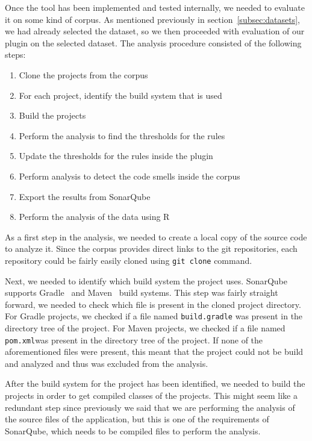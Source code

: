 
Once the tool has been implemented and tested internally, we needed to evaluate it on some kind of corpus.
As mentioned previously in section~\ref{subsec:datasets}, we had already selected the dataset, so we then proceeded with
evaluation of our plugin on the selected dataset.
The analysis procedure consisted of the following steps:
\begin{enumerate}
    \item Clone the projects from the corpus
    \item For each project, identify the build system that is used
    \item Build the projects
    \item Perform the analysis to find the thresholds for the rules
    \item Update the thresholds for the rules inside the plugin
    \item Perform analysis to detect the code smells inside the corpus
    \item Export the results from SonarQube
    \item Perform the analysis of the data using R
\end{enumerate}

As a first step in the analysis, we needed to create a local copy of the source code to analyze it.
Since the corpus provides direct links to the git repositories, each repository could be fairly easily cloned
using \verb|git clone| command.

Next, we needed to identify which build system the project uses.
SonarQube supports Gradle~\cite{gradle} and Maven~\cite{maven} build systems.
This step was fairly straight forward, we needed to check which file is present in the cloned project
directory.
For Gradle projects, we checked if a file named \verb|build.gradle| was present in the directory tree of the project.
For Maven projects, we checked if a file named \verb|pom.xml|was present in the directory tree of the project.
If none of the aforementioned files were present, this meant that the project could not be build and analyzed and thus
was excluded from the analysis.

After the build system for the project has been identified, we needed to build the projects in order
to get compiled classes of the projects.
This might seem like a redundant step since previously we said that we are performing the analysis of the source
files of the application, but this is one of the requirements of SonarQube, which needs to be compiled files to
perform the analysis.

